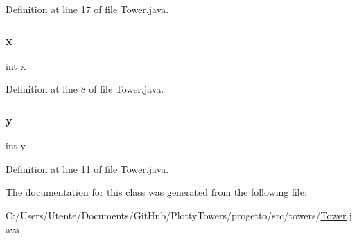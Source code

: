 Definition at line 17 of file Tower.\+java.

\mbox{\label{classtowers_1_1_tower_a6150e0515f7202e2fb518f7206ed97dc}} 
\subsubsection{\texorpdfstring{x}{x}}
{\footnotesize\ttfamily int x\hspace{0.3cm}{\ttfamily [private]}}



Definition at line 8 of file Tower.\+java.

\mbox{\label{classtowers_1_1_tower_a0a2f84ed7838f07779ae24c5a9086d33}} 
\subsubsection{\texorpdfstring{y}{y}}
{\footnotesize\ttfamily int y\hspace{0.3cm}{\ttfamily [private]}}



Definition at line 11 of file Tower.\+java.



The documentation for this class was generated from the following file\+:\begin{DoxyCompactItemize}
\item 
C\+:/\+Users/\+Utente/\+Documents/\+Git\+Hub/\+Plotty\+Towers/progetto/src/towers/\hyperlink{_tower_8java}{Tower.\+java}\end{DoxyCompactItemize}
